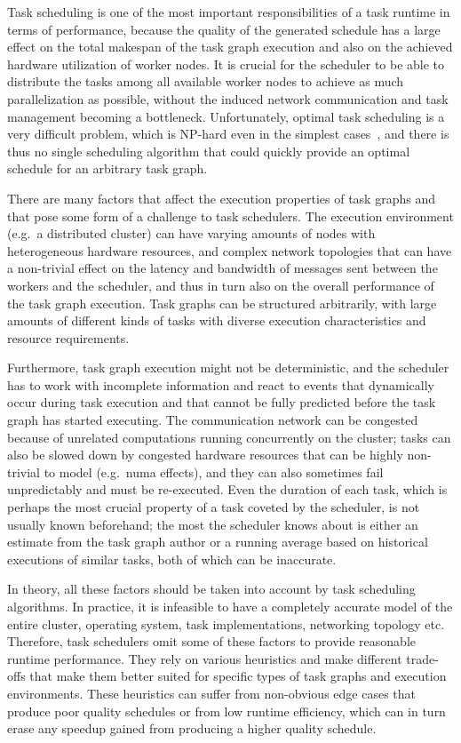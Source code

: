 Task scheduling is one of the most important responsibilities of a task runtime in terms of
performance, because the quality of the generated schedule has a large effect on the total makespan
of the task graph execution and also on the achieved hardware utilization of worker nodes. It is
crucial for the scheduler to be able to distribute the tasks among all available worker nodes to
achieve as much parallelization as possible, without the induced network communication and task
management becoming a bottleneck. Unfortunately, optimal task scheduling is a very difficult
problem, which is NP-hard even in the simplest cases~\cite{Ullman1975}, and there is thus no
single scheduling algorithm that could quickly provide an optimal schedule for an arbitrary task
graph.

There are many factors that affect the execution properties of task graphs and that pose some form
of a challenge to task schedulers. The execution environment (e.g.\ a distributed cluster) can have
varying amounts of nodes with heterogeneous hardware resources, and complex network topologies that
can have a non-trivial effect on the latency and bandwidth of messages sent between the workers and
the scheduler, and thus in turn also on the overall performance of the task graph execution. Task
graphs can be structured arbitrarily, with large amounts of different kinds of tasks with diverse
execution characteristics and resource requirements.

Furthermore, task graph execution might not be deterministic, and the scheduler has to work with
incomplete information and react to events that dynamically occur during task execution and that
cannot be fully predicted before the task graph has started executing. The communication network
can be congested because of unrelated computations running concurrently on the cluster; tasks can
also be slowed down by congested hardware resources that can be highly non-trivial to model (e.g.\
\gls{numa} effects), and they can also sometimes fail unpredictably and must be
re-executed. Even the duration of each task, which is perhaps the most crucial property of a task
coveted by the scheduler, is not usually known beforehand; the most the scheduler knows about
is either an estimate from the task graph author or a running average based on historical
executions of similar tasks, both of which can be inaccurate.

In theory, all these factors should be taken into account by task scheduling algorithms. In
practice, it is infeasible to have a completely accurate model of the entire cluster, operating
system, task implementations, networking topology etc. Therefore, task schedulers omit some of
these factors to provide reasonable runtime performance. They rely on various heuristics and make
different trade-offs that make them better suited for specific types of task graphs and execution
environments. These heuristics can suffer from non-obvious edge cases that produce poor quality
schedules or from low runtime efficiency, which can in turn erase any speedup gained from producing
a higher quality schedule.

